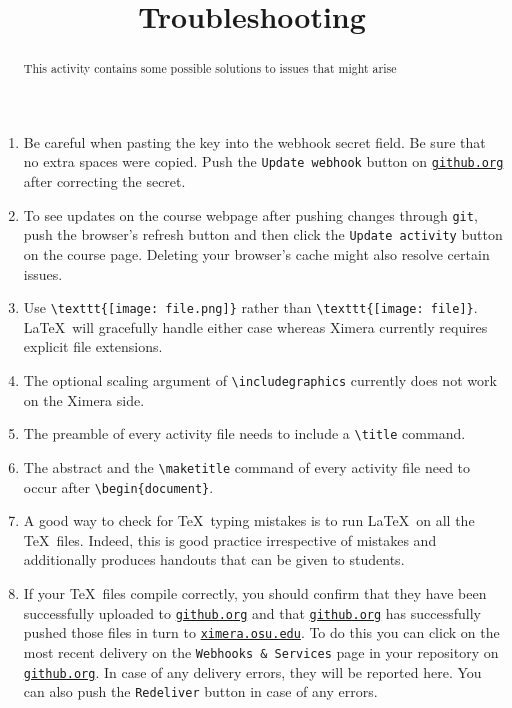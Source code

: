 \documentclass{ximera}
\title{Troubleshooting}
\begin{document}
\begin{abstract}
This activity contains some possible solutions
to issues that might arise
\end{abstract}
\maketitle
\begin{enumerate}
\item Be careful when pasting the key into
the webhook secret field. Be sure that no extra
spaces were copied. Push the \verb!Update webhook! button on
\href{http://github.org}{\tt github.org}
after correcting the secret.

\item To see updates on the course webpage
after pushing changes through \verb!git!,
push the browser's refresh button
and then click the \verb!Update activity! button 
on the course page. Deleting your browser's cache
might also resolve certain issues.

\item Use \verb!\texttt{[image: file.png]}! rather than
\verb!\texttt{[image: file]}!. \LaTeX\ will gracefully handle either
case whereas Ximera currently requires explicit file extensions.

\item The optional scaling argument of \verb!\includegraphics!
currently does not work on the Ximera side.

\item The preamble of every activity file needs to 
include a \verb!\title! command. 

\item The abstract 
and the \verb!\maketitle! command
of every activity file
need to occur after \verb!\begin{document}!.

\item A good way to check for \TeX\ typing mistakes
is to run \LaTeX\ on all the \TeX\ files. Indeed, this
is good practice irrespective of mistakes
and additionally produces handouts that
can be given to students.

\item If your \TeX\ files compile correctly,
you should confirm that they have been successfully uploaded to
\href{http://github.org}{\tt github.org} and that 
\href{http://github.org}{\tt github.org} has successfully
pushed those files in turn to
\href{http://ximera.osu.edu}{\tt ximera.osu.edu}.
To do this you can click on the most recent delivery
on the \verb!Webhooks & Services! page in your repository on
\href{http://github.org}{\tt github.org}.
In case of any delivery errors, they will be reported here.
You can also push the \verb!Redeliver! button
in case of any errors.

\end{enumerate}
\end{document}
